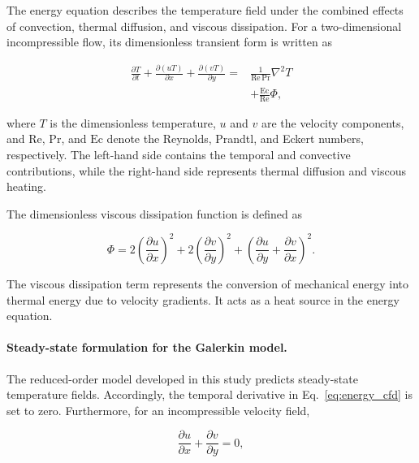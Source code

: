 The energy equation describes the temperature field under the
combined effects of convection, thermal diffusion, and viscous
dissipation. For a two-dimensional incompressible flow, its
dimensionless transient form is written as

\begin{equation}
\begin{aligned}
\frac{\partial T}{\partial t}
+\frac{\partial (uT)}{\partial x}
+\frac{\partial (vT)}{\partial y}
={}&
\frac{1}{\mathrm{Re}\,\mathrm{Pr}}\nabla^2 T
\\
&+\frac{\mathrm{Ec}}{\mathrm{Re}}\Phi,
\end{aligned}
\label{eq:energy_cfd}
\end{equation}

where $T$ is the dimensionless temperature, $u$ and $v$ are
the velocity components, and $\mathrm{Re}$, $\mathrm{Pr}$,
and $\mathrm{Ec}$ denote the Reynolds, Prandtl, and Eckert
numbers, respectively. The left-hand side contains the
temporal and convective contributions, while the right-hand
side represents thermal diffusion and viscous heating.

The dimensionless viscous dissipation function is defined as

\begin{equation}
\Phi =
2\left(\frac{\partial u}{\partial x}\right)^2
+2\left(\frac{\partial v}{\partial y}\right)^2
+\left(
\frac{\partial u}{\partial y}
+\frac{\partial v}{\partial x}
\right)^2.
\label{eq:viscous_dissipation}
\end{equation}

The viscous dissipation term represents the conversion of
mechanical energy into thermal energy due to velocity gradients.
It acts as a heat source in the energy equation.

\paragraph{Steady-state formulation for the Galerkin model.}

The reduced-order model developed in this study predicts steady-state
temperature fields. Accordingly, the temporal derivative in
Eq.~\eqref{eq:energy_cfd} is set to zero. Furthermore, for an
incompressible velocity field,

\begin{equation}
    \frac{\partial u}{\partial x}
    +\frac{\partial v}{\partial y}=0,
\end{equation}

